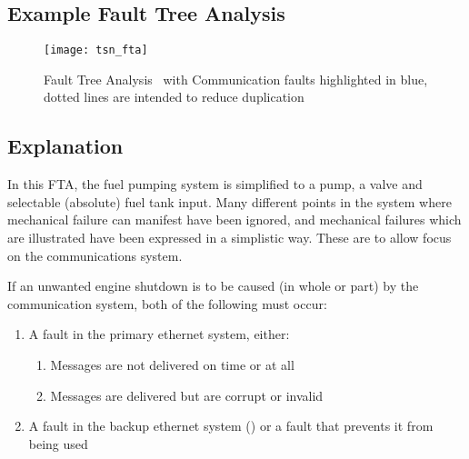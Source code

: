 \subsection{Example Fault Tree Analysis}


\begin{figure}[H]
\centering
\texttt{[image: tsn\_fta]}
\caption{Fault Tree Analysis~\cite{w.e.veselyFaultTreeHandbook1981} with Communication faults highlighted in blue, dotted lines are intended to reduce duplication}
\end{figure}

\subsection{Explanation}


In this FTA, the fuel pumping system is simplified to a pump, a valve and selectable (absolute) fuel tank input.
Many different points in the system where mechanical failure can manifest have been ignored, and mechanical failures which are illustrated have been expressed in a simplistic way.
These are to allow focus on the communications system.

If an unwanted engine shutdown is to be caused (in whole or part) by the communication system, both of the following must occur:

\begin{enumerate}
    \item A fault in the primary ethernet system, either: \begin{enumerate}
        \item Messages are not delivered on time or at all
        \item Messages are delivered but are corrupt or invalid
    \end{enumerate}
    \item A fault in the backup ethernet system () or a fault that prevents it from being used
\end{enumerate}

